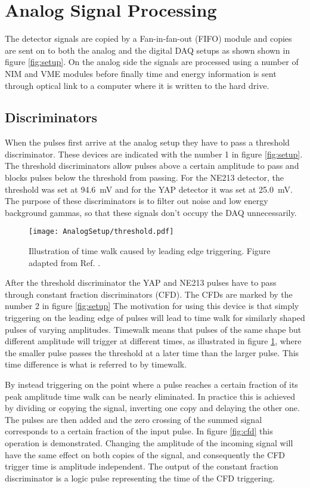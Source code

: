 \documentclass[main.tex]{subfiles}
\begin{document}
\section{Analog Signal Processing}
The detector signals are copied by a Fan-in-fan-out (FIFO) module and copies are sent on to both the analog and the digital DAQ setups as shown shown in figure \ref{fig:setup}. On the analog side the signals are processed using a number of NIM and VME modules before finally time and energy information is sent through optical link to a computer where it is written to the hard drive. 

\subsection{Discriminators}
When the pulses first arrive at the analog setup they have to pass a threshold discriminator. These devices are indicated with the number 1 in figure \ref{fig:setup}. The threshold discriminators allow pulses above a certain amplitude to pass and blocks pulses below the threshold from passing. For the NE213 detector, the threshold was set at \SI{94.6}{mV} and for the YAP detector it was set at \SI{25.0}{mV}. The purpose of these discriminators is to filter out noise and low energy background gammas, so that these signals don't occupy the DAQ unnecessarily.

\begin{figure}[h]
    \centering
        \texttt{[image: AnalogSetup/threshold.pdf]}
        \caption[Threshold discriminators and time walk]{Illustration of time walk caused by leading edge triggering. Figure adapted from Ref. \cite{rofors}.}
    \label{fig:discriminator}
\end{figure}

After the threshold discriminator the YAP and NE213 pulses have to pass through constant fraction discriminators (CFD). The CFDs are marked by the number 2 in figure \ref{fig:setup} The motivation for using this device is that simply triggering on the leading edge of pulses will lead to time walk for similarly shaped pulses of varying amplitudes. Timewalk means that pulses of the same shape but different amplitude will trigger at different times, as illustrated in figure \ref{fig:discriminator}, where the smaller pulse passes the threshold at a later time than the larger pulse. This time difference is what is referred to by timewalk. 

By instead triggering on the point where a pulse reaches a certain fraction of its peak amplitude time walk can be nearly eliminated\citep[pg.327]{Leo}. In practice this is achieved by dividing or copying the signal, inverting one copy and delaying the other one. The pulses are then added and the zero crossing of the summed signal corresponds to a certain fraction of the input pulse. In figure \ref{fig:cfd} this operation is demonstrated. Changing the amplitude of the incoming signal will have the same effect on both copies of the signal, and consequently the CFD trigger time is amplitude independent. The output of the constant fraction discriminator is a logic pulse representing the time of the CFD triggering.
\end{document}
